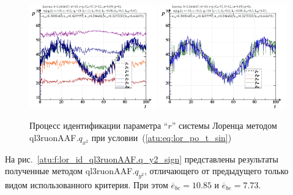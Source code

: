 \begin{figure}[ht!]
  \centerline{
    \includegraphics[width=0.49\textwidth]{p/cha/lor/ql3ruonAAF/lor_ql3ruonAAF_qy2-p_t_pi_sin.png}
    \hfill
    \includegraphics[width=0.49\textwidth]{p/cha/lor/ql3ruonAAF/lor_ql3ruonAAF_qy2-p_t_pz_sin.png}
  }
  \caption{Процесс идентификации параметра ``$r$'' системы Лоренца методом ql3ruonAAF.$q_{x^2}$ при условии~(\ref{atu:eq:lor_po_t_sin})}
  \label{atu:f:lor_id_ql3ruonAAF.q_x2_sin}
\end{figure}


На рис.~\ref{atu:f:lor_id_ql3ruonAAF.q_y2_sign} представлены результаты
полученные методом ql3ruonAAF.$q_{y^2}$,
отличающего от предыдущего только видом использованного критерия.
При этом
$\overline{e}_{bc}=10.85$
и
$\overline{e}_{be}=7.73$.

